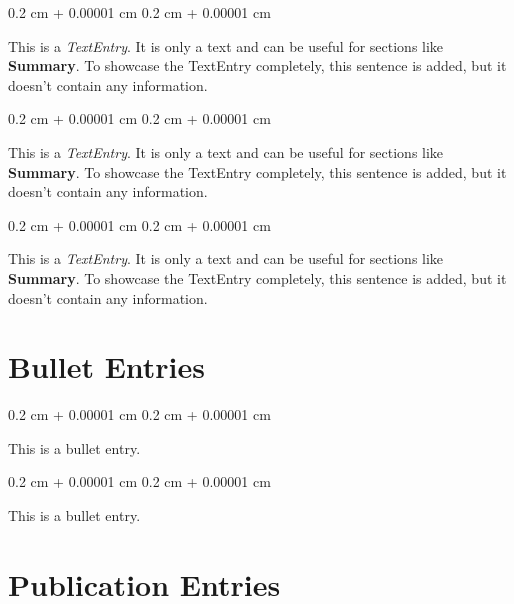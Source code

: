 \documentclass[10pt, letterpaper]{article}
\newenvironment{onecolentry}{
    \begin{adjustwidth}{
        0.2 cm + 0.00001 cm
    }{
        0.2 cm + 0.00001 cm
    }
}{
    \end{adjustwidth}
} %
\begin{document}
        
        \begin{onecolentry}
            This is a \textit{TextEntry}. It is only a text and can be useful for sections like \textbf{Summary}. To showcase the TextEntry completely, this sentence is added, but it doesn't contain any information.
        \end{onecolentry}

        \vspace{0.2 cm}

        \begin{onecolentry}
            This is a \textit{TextEntry}. It is only a text and can be useful for sections like \textbf{Summary}. To showcase the TextEntry completely, this sentence is added, but it doesn't contain any information.
        \end{onecolentry}

        \vspace{0.2 cm}

        \begin{onecolentry}
            This is a \textit{TextEntry}. It is only a text and can be useful for sections like \textbf{Summary}. To showcase the TextEntry completely, this sentence is added, but it doesn't contain any information.
        \end{onecolentry}


    
    \section{Bullet Entries}

        
        \begin{onecolentry}
            \textbullet \hspace{0.6 cm-0.2cm}This is a bullet entry.
        \end{onecolentry}

        \vspace{0.2 cm}

        \begin{onecolentry}
            \textbullet \hspace{0.6 cm-0.2cm}This is a bullet entry.
        \end{onecolentry}


    
    \section{Publication Entries}
\end{document}
